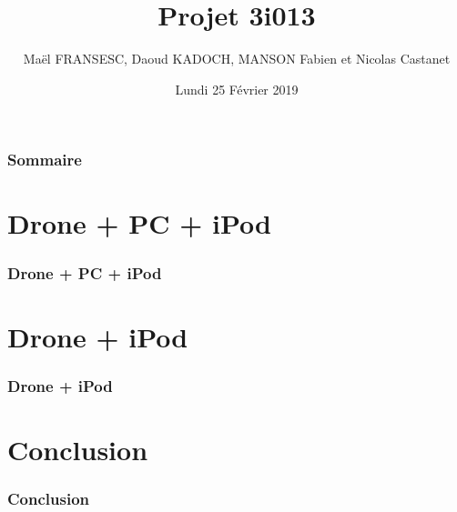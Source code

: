 \documentclass[11pt]{beamer}
\author{Maël FRANSESC, Daoud KADOCH, MANSON Fabien et Nicolas Castanet}
\title{Projet 3i013}
\institute{Sorbonne Université}
\date{Lundi 25 Février 2019}
\begin{document}
\begin{frame}
\titlepage
\end{frame}

\begin{frame}
\frametitle{Sommaire}
\tableofcontents[sections={1-4}]
\end{frame}

\section{Drone + PC + iPod}
\begin{frame}
\frametitle{Drone + PC + iPod}
\end{frame}

\section{Drone + iPod}
\begin{frame}
\frametitle{Drone + iPod}
\end{frame}

\section{Conclusion}
\begin{frame}
\frametitle{Conclusion}
\end{frame}
\end{document}
